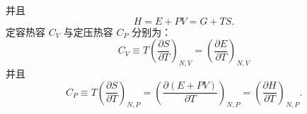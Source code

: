 并且
\begin{equation}\tag{1.3.17}\label{eq:1.3.17}
H = E + P V = G + T S .
\end{equation}
定容热容 \(C_{V}\) 与定压热容 \(C_{P}\) 分别为：
\begin{equation}\tag{1.3.18}\label{eq:1.3.18}
C _ { V } \equiv T \left( \frac { \partial S } { \partial T } \right) _ { N , V } = \left( \frac { \partial E } { \partial T } \right) _ { N , V }
\end{equation}
并且
\begin{equation}\tag{1.3.19}\label{eq:1.3.19}
C _ { P } \equiv T \left( \frac { \partial S } { \partial T } \right) _ { N , P } = \left( \frac { \partial ( E + P V ) } { \partial T } \right) _ { N , P } = \left( \frac { \partial H } { \partial T } \right) _ { N , P } .
\end{equation}
